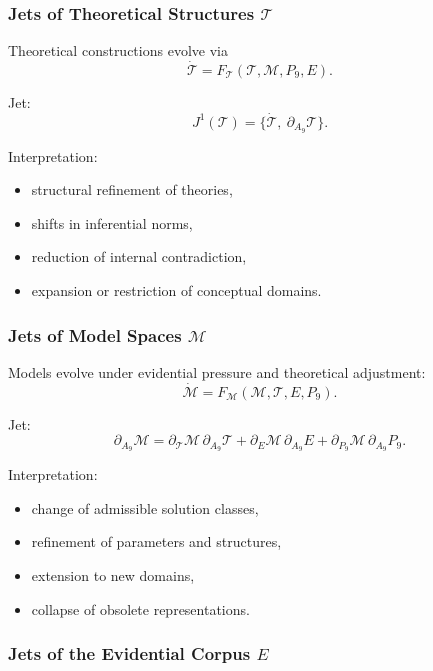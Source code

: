 \subsubsection{Jets of Theoretical Structures $\mathcal{T}$}

Theoretical constructions evolve via
\[
\dot{\mathcal{T}}=F_{\mathcal{T}}(\mathcal{T},\mathcal{M},P_9,E).
\]

Jet:
\[
J^1(\mathcal{T})
=
\{\dot{\mathcal{T}},\ \partial_{A_9}\mathcal{T}\}.
\]

Interpretation:
\begin{itemize}
    \item structural refinement of theories,
    \item shifts in inferential norms,
    \item reduction of internal contradiction,
    \item expansion or restriction of conceptual domains.
\end{itemize}


\subsubsection{Jets of Model Spaces $\mathcal{M}$}

Models evolve under evidential pressure and theoretical adjustment:
\[
\dot{\mathcal{M}}=
F_{\mathcal{M}}(\mathcal{M},\mathcal{T},E,P_9).
\]

Jet:
\[
\partial_{A_9}\mathcal{M}
=
\partial_{\mathcal{T}}\mathcal{M}\,\partial_{A_9}\mathcal{T}
+
\partial_{E}\mathcal{M}\,\partial_{A_9}E
+
\partial_{P_9}\mathcal{M}\,\partial_{A_9}P_9.
\]

Interpretation:
\begin{itemize}
    \item change of admissible solution classes,
    \item refinement of parameters and structures,
    \item extension to new domains,
    \item collapse of obsolete representations.
\end{itemize}


\subsubsection{Jets of the Evidential Corpus \texorpdfstring{$E$}{E}}

